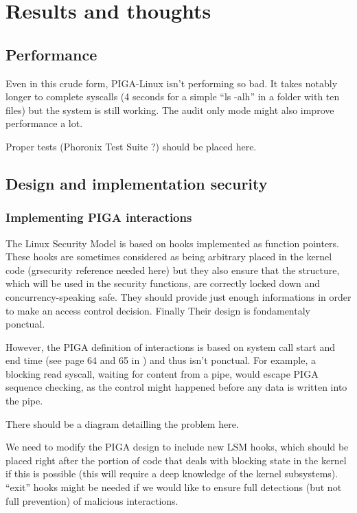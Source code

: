 \documentclass[pdftex,a4paper,titlepage,11pt]{article}
\begin{document}
\section{Results and thoughts}

\subsection{Performance}

Even in this crude form, PIGA-Linux isn't performing so bad. It takes notably
longer to complete syscalls (4 seconds for a simple ``ls -alh'' in a folder with
ten files) but the system is still working. The audit only mode might also
improve performance a lot.

Proper tests (Phoronix Test Suite ?) should be placed here.

\subsection{Design and implementation security}

\subsubsection{Implementing PIGA interactions}

The Linux Security Model is based on hooks implemented as function pointers.
These hooks are sometimes considered as being arbitrary placed in the kernel
code (grsecurity reference needed here) but they also ensure that the structure,
which will be used in the security functions, are correctly locked down and
concurrency-speaking safe. They should provide just enough informations in order
to make an access control decision. Finally Their design is fondamentaly
ponctual.

\bigskip

However, the PIGA definition of interactions is based on system call start and
end time (see page 64 and 65 in \cite{THESEBRIFFAUT}) and thus isn't ponctual.
For example, a blocking read syscall, waiting for content from a pipe, would
escape PIGA sequence checking, as the control might happened before any data is
written into the pipe.

\bigskip

There should be a diagram detailling the problem here.

\bigskip

We need to modify the PIGA design to include new LSM hooks, which should be
placed right after the portion of code that deals with blocking state in the
kernel if this is possible (this will require a deep knowledge of the kernel
subsystems). ``exit'' hooks might be needed if we would like to ensure full
detections (but not full prevention) of malicious interactions.
\end{document}

